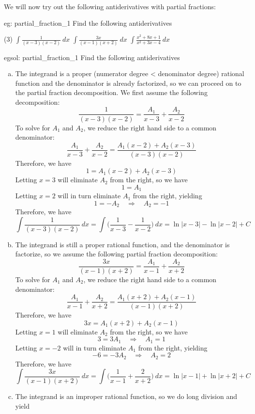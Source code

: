 We will now try out the following antiderivatives with partial fractions:
\begin{eg}[]{eg: partial_fraction_1}
    Find the following antiderivatives
    \begin{tasks}(3)
        \task $\int \frac{1}{(x-3)(x-2)}~dx$
        \task $\int \frac{3x}{(x-1)(x+2)}~dx$
        \task $\int \frac{x^2 + 8 x +1}{x^2+3x-4}~dx$
    \end{tasks}
\end{eg}
\begin{egsol}[]{egsol: partial_fraction_1}
    Find the following antiderivatives
    \begin{enumerate}[a)]
        \item The integrand is a proper (numerator degree < denominator degree) rational function and the denominator is already factorized, so we can proceed on to the partial fraction decomposition.  We first assume the following decomposition:
        \[\frac{1}{(x-3)(x-2)} = \frac{A_1}{x-3} + \frac{A_2}{x-2}\]
        To solve for $A_1$ and $A_2$, we reduce the right hand side to a common denominator:
        \[\frac{A_1}{x-3} + \frac{A_2}{x-2} = \frac{A_1(x-2)+A_2(x-3)}{(x-3)(x-2)}\]
        Therefore, we have
        \[1 = A_1(x-2)+A_2(x-3)\]  
        Letting $x = 3$ will eliminate $A_2$ from the right, so we have 
        \[1 = A_1\]
        Letting $x = 2$ will in turn eliminate $A_1$ from the right, yielding
        \[1 = -A_2 \quad \Rightarrow \quad A_2 = -1\]
        Therefore, we have 
        \[\int \frac{1}{(x-3)(x-2)}~dx = \int \Big(\frac{1}{x-3}-\frac{1}{x-2}\Big)~dx = \ln|x-3| - \ln|x-2| + C\]
        \item The integrand is still a proper rational function, and the denominator is factorize, so we assume the following partial fraction decomposition:
        \[\frac{3x}{(x-1)(x+2)} = \frac{A_1}{x-1} + \frac{A_2}{x+2}\]
        To solve for $A_1$ and $A_2$, we reduce the right hand side to a common denominator:
        \[\frac{A_1}{x-1} + \frac{A_2}{x+2} = \frac{A_1(x+2)+A_2(x-1)}{(x-1)(x+2)}\]
        Therefore, we have
        \[3x = A_1(x+2) + A_2(x-1)\]
        Letting $x = 1$ will eliminate $A_2$ from the right, so we have 
        \[3 = 3A_1 \quad \Rightarrow \quad A_1 = 1\]
        Letting $x = -2$ will in turn eliminate $A_1$ from the right, yielding
        \[-6 = -3A_2 \quad \Rightarrow \quad A_2 = 2\]
        Therefore, we have
        \[\int \frac{3x}{(x-1)(x+2)}~dx = \int \Big(\frac{1}{x-1}+\frac{2}{x+2}\Big)~dx = \ln|x-1| + \ln|x+2| + C\]
        \item The integrand is an improper rational function, so we do long division and yield

\end{enumerate}
\end{egsol}
